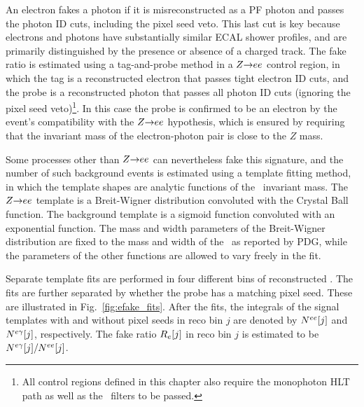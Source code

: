 An electron fakes a photon if it is misreconstructed as a PF photon and passes the photon ID cuts, including the pixel seed veto. This last cut is key because electrons
and photons have substantially similar ECAL shower profiles, and are primarily distinguished by the presence or absence of a charged track.
The fake ratio is estimated using a tag-and-probe method in a $Z{\rightarrow}ee$ control region, in which the tag is
a reconstructed electron that passes tight electron ID cuts, and the probe is a reconstructed photon that passes all photon ID cuts (ignoring the pixel
seed veto)\footnote{All control regions defined in this chapter also require the monophoton HLT path as well as the \MET\ filters to be passed.}.
In this case the probe is confirmed to be an electron by the event's compatibility with the $Z{\rightarrow}ee$ hypothesis, which is ensured by requiring that the invariant mass
of the electron-photon pair is close to the $Z$ mass.

Some processes other than $Z{\rightarrow}ee$ can nevertheless fake this signature, and the number of such background events is estimated using a template fitting method,
in which the template shapes are analytic functions of the \Pe\Pe\ invariant mass.
The $Z{\rightarrow}ee$ template is a Breit-Wigner distribution convoluted with the Crystal Ball function.
The background template is a sigmoid function convoluted with an exponential function.
The mass and width parameters of the Breit-Wigner distribution are fixed to the mass and width of the \PZ\ as reported by PDG, while the parameters of the other functions
are allowed to vary freely in the fit.

Separate template fits are performed in four different bins of reconstructed \ETgamma.
The fits are further separated by whether the probe has a matching pixel seed. These are illustrated in Fig.~\ref{fig:efake_fits}.
After the fits, the integrals of the signal templates with and without
pixel seeds in reco bin $j$ are denoted by $N^{ee}[j]$ and $N^{e\gamma}[j]$, respectively.
The fake ratio $R_{e}[j]$ in reco bin $j$ is estimated to be $N^{e\gamma}[j] / N^{ee}[j]$.

